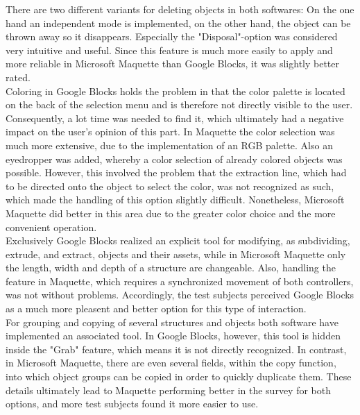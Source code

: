 \documentclass{report}
\begin{document}
			There are two different variants for deleting objects in both softwares: On the one hand an independent mode is implemented, on the other hand, the object can be thrown away so it disappears. Especially the "Disposal"-option was considered very intuitive and useful. Since this feature is much more easily to apply and more reliable in Microsoft Maquette than Google Blocks, it was slightly better rated. \\
			Coloring in Google Blocks holds the problem in that the color palette is located on the back of the selection menu and is therefore not directly visible to the user. Consequently, a lot time was needed to find it, which ultimately had a negative impact on the user's opinion of this part. In Maquette the color selection was much more extensive, due to the implementation of an RGB palette. Also an eyedropper was added, whereby a color selection of already colored objects was possible. However, this involved the problem that the extraction line, which had to be directed onto the object to select the color, was not recognized as such, which made the handling of this option slightly difficult. Nonetheless, Microsoft Maquette did better in this area due to the greater color choice and the more convenient operation. \\
			Exclusively Google Blocks realized an explicit tool for modifying, as subdividing, extrude, and extract, objects and their assets, while in Microsoft Maquette only the length, width and depth of a structure are changeable. Also, handling the feature in Maquette, which requires a synchronized movement of both controllers, was not without problems. Accordingly, the test subjects perceived Google Blocks as a much more pleasent and better option for this type of interaction. \\
			For grouping and copying of several structures and objects both software have implemented an associated tool. In Google Blocks, however, this tool is hidden inside the "Grab" feature, which means it is not directly recognized. In contrast, in Microsoft Maquette, there are even several fields, within the copy function, into which object groups can be copied in order to quickly duplicate them. These details ultimately lead to Maquette performing better in the survey for both options, and more test subjects found it more easier to use. \\
		\closesection
\end{document}
